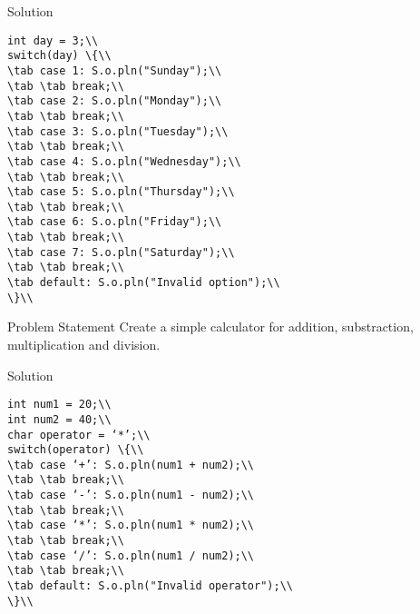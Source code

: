 \documentclass[aspectratio=169,14pt,usenames,dvipsnames]{beamer}
\newcommand\tab[1][1cm]{\hspace*{#1}}
\begin{document}
\begin{frame}{Solution}

\begin{lstlisting}
int day = 3;\\
switch(day) \{\\
\tab case 1: S.o.pln("Sunday");\\
\tab \tab break;\\
\tab case 2: S.o.pln("Monday");\\
\tab \tab break;\\
\tab case 3: S.o.pln("Tuesday");\\
\tab \tab break;\\
\tab case 4: S.o.pln("Wednesday");\\
\tab \tab break;\\
\tab case 5: S.o.pln("Thursday");\\
\tab \tab break;\\
\tab case 6: S.o.pln("Friday");\\
\tab \tab break;\\
\tab case 7: S.o.pln("Saturday");\\
\tab \tab break;\\
\tab default: S.o.pln("Invalid option");\\
\}\\
\end{lstlisting}
\end{frame}

\begin{frame}{Problem Statement}
Create a simple calculator for addition,
substraction, multiplication and division.
\end{frame}

\begin{frame}{Solution}
\begin{lstlisting}
int num1 = 20;\\
int num2 = 40;\\
char operator = ‘*’;\\
switch(operator) \{\\
\tab case ‘+’: S.o.pln(num1 + num2);\\
\tab \tab break;\\
\tab case ‘-’: S.o.pln(num1 - num2);\\
\tab \tab break;\\
\tab case ‘*’: S.o.pln(num1 * num2);\\
\tab \tab break;\\
\tab case ‘/’: S.o.pln(num1 / num2);\\
\tab \tab break;\\
\tab default: S.o.pln("Invalid operator");\\
\}\\
\end{lstlisting}
\end{frame}
\end{document}
